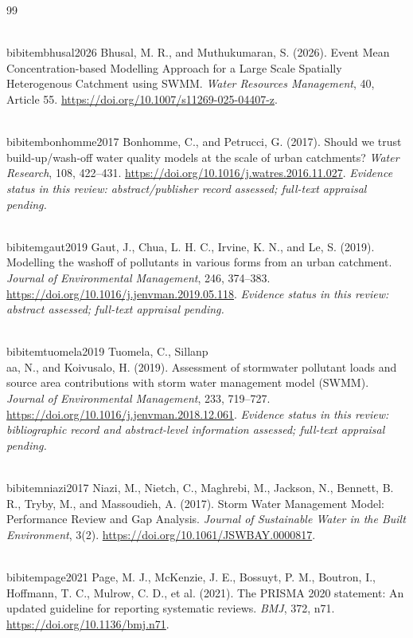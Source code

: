 \documentclass[journal]{IEEEtran}
\begin{document}
\begin{thebibliography}{99}

\\bibitem{bhusal2026}
Bhusal, M. R., and Muthukumaran, S. (2026).
Event Mean Concentration-based Modelling Approach for a Large Scale Spatially Heterogenous Catchment using SWMM.
\textit{Water Resources Management}, 40, Article 55.
\url{https://doi.org/10.1007/s11269-025-04407-z}.

\\bibitem{bonhomme2017}
Bonhomme, C., and Petrucci, G. (2017).
Should we trust build-up/wash-off water quality models at the scale of urban catchments?
\textit{Water Research}, 108, 422--431.
\url{https://doi.org/10.1016/j.watres.2016.11.027}.
\textit{Evidence status in this review: abstract/publisher record assessed; full-text appraisal pending.}

\\bibitem{gaut2019}
Gaut, J., Chua, L. H. C., Irvine, K. N., and Le, S. (2019).
Modelling the washoff of pollutants in various forms from an urban catchment.
\textit{Journal of Environmental Management}, 246, 374--383.
\url{https://doi.org/10.1016/j.jenvman.2019.05.118}.
\textit{Evidence status in this review: abstract assessed; full-text appraisal pending.}

\\bibitem{tuomela2019}
Tuomela, C., Sillanp\\aa, N., and Koivusalo, H. (2019).
Assessment of stormwater pollutant loads and source area contributions with storm water management model (SWMM).
\textit{Journal of Environmental Management}, 233, 719--727.
\url{https://doi.org/10.1016/j.jenvman.2018.12.061}.
\textit{Evidence status in this review: bibliographic record and abstract-level information assessed; full-text appraisal pending.}

\\bibitem{niazi2017}
Niazi, M., Nietch, C., Maghrebi, M., Jackson, N., Bennett, B. R., Tryby, M., and Massoudieh, A. (2017).
Storm Water Management Model: Performance Review and Gap Analysis.
\textit{Journal of Sustainable Water in the Built Environment}, 3(2).
\url{https://doi.org/10.1061/JSWBAY.0000817}.

\\bibitem{page2021}
Page, M. J., McKenzie, J. E., Bossuyt, P. M., Boutron, I., Hoffmann, T. C., Mulrow, C. D., et al. (2021).
The PRISMA 2020 statement: An updated guideline for reporting systematic reviews.
\textit{BMJ}, 372, n71.
\url{https://doi.org/10.1136/bmj.n71}.


\end{thebibliography}
\end{document}
